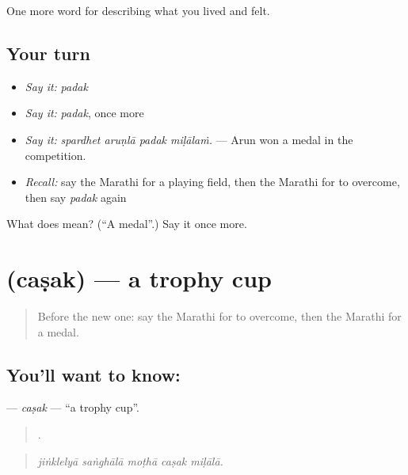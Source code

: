 \begin{grammarlens}[title={What you've built}]
One more word for describing what you lived and felt.
\end{grammarlens}

\subsection*{Your turn}
\begin{itemize}
\raggedright
  \item \emph{Say it:} \emph{padak}
  \item \emph{Say it:} \emph{padak}, once more
  \item \emph{Say it:} \emph{spardhet aruṇlā padak miḷālaṁ.} — Arun won a medal in the competition.
  \item \emph{Recall:} say the Marathi for a playing field, then the Marathi for to overcome, then say \emph{padak} again
\end{itemize}

\begin{tcolorbox}[breakable,colback=teal!4,colframe=teal!35!black,title={Before you move on}]
What does  mean? (\textquotedblleft{}A medal\textquotedblright{}.) Say it once more.
\end{tcolorbox}
\section[\texorpdfstring{\mr{चषक} (caṣak)}{चषक (caṣak)}]{ (caṣak) — a trophy cup}

\label{lesson:MR-C530-casak}



\begin{quote}
Before the new one: say the Marathi for to overcome, then the Marathi for a medal.
\end{quote}

\subsection*{You'll want to know: }
\textbf{} — \emph{caṣak} — \textquotedblleft{}a trophy cup\textquotedblright{}.

\begin{quote}
    .
\end{quote}

\begin{quote}
\emph{jiṅklelyā saṅghālā moṭhā caṣak miḷālā.}
\end{quote}

